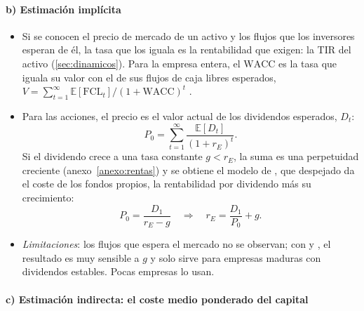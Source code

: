 \documentclass[11pt]{article}
\begin{document}
\paragraph{b) Estimación implícita}

\begin{itemize}
\item Si se conocen el precio de mercado de un activo y los flujos que los inversores esperan de él, la tasa que los iguala es la rentabilidad que exigen: la TIR del activo (\ref{sec:dinamicos}). Para la empresa entera, el $\mathrm{WACC}$ es la tasa que iguala su valor con el de sus flujos de caja libres esperados, $V=\sum_{t=1}^{\infty}\mathbb{E}[\mathrm{FCL}_t]/(1+\mathrm{WACC})^t$ .
\item Para las acciones, el precio es el valor actual de los dividendos esperados, $D_t$:
  \[
  P_0=\sum_{t=1}^{\infty}\frac{\mathbb{E}[D_t]}{(1+r_E)^t}.
  \]
  Si el dividendo crece a una tasa constante $g<r_E$, la suma es una perpetuidad creciente (anexo~\ref{anexo:rentas}) y se obtiene el modelo de \textcite{GordonShapiro1956Capital} , que despejado da el coste de los fondos propios, la rentabilidad por dividendo más su crecimiento:
  \[
  P_0=\frac{D_1}{r_E-g}\quad\Longrightarrow\quad r_E=\frac{D_1}{P_0}+g.
  \]
\item \emph{Limitaciones}: los flujos que espera el mercado no se observan; con  y , el resultado es muy sensible a $g$ y solo sirve para empresas maduras con dividendos estables. Pocas empresas lo usan\nocite{GrahamHarvey2002How}.
\end{itemize}

\paragraph{c) Estimación indirecta: el coste medio ponderado del capital}
\end{document}
